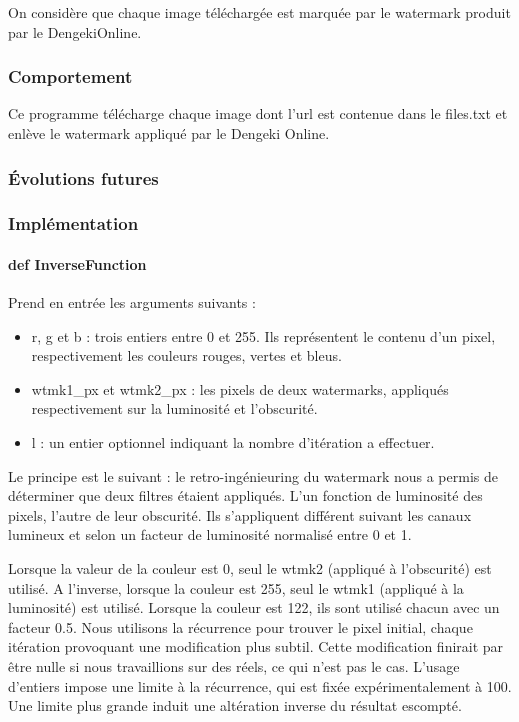 \documentclass[a4paper,12pt]{article}
\begin{document}
On considère que chaque image téléchargée est marquée par le watermark produit par le DengekiOnline.
\subsubsection{Comportement}
Ce programme télécharge chaque image dont l'url est contenue dans le files.txt et enlève le watermark appliqué par le Dengeki Online.
\subsubsection{Évolutions futures}
\subsubsection{Implémentation}
\paragraph{def InverseFunction}
Prend en entrée les arguments suivants :
\begin{itemize}
\item r, g et b : trois entiers entre 0 et 255. Ils représentent le contenu d'un pixel, respectivement les couleurs rouges, vertes et bleus.
\item wtmk1\_px et wtmk2\_px : les pixels de deux watermarks, appliqués respectivement sur la luminosité et l'obscurité.
\item l : un entier optionnel indiquant la nombre d'itération a effectuer.
\end{itemize}
Le principe est le suivant : le retro-ingénieuring du watermark nous a permis de déterminer que deux filtres étaient appliqués. L'un fonction de luminosité des pixels, l'autre de leur obscurité. Ils s'appliquent différent suivant les canaux lumineux et selon un facteur de luminosité normalisé entre 0 et 1.

Lorsque la valeur de la couleur est 0, seul le wtmk2 (appliqué à l'obscurité) est utilisé. A l'inverse, lorsque la couleur est 255, seul le wtmk1 (appliqué à la luminosité) est utilisé. Lorsque la couleur est 122, ils sont utilisé chacun avec un facteur 0.5. 
Nous utilisons la récurrence pour trouver le pixel initial, chaque itération provoquant une modification plus subtil. Cette modification finirait par être nulle si nous travaillions sur des réels, ce qui n'est pas le cas. L'usage d'entiers impose une limite à la récurrence, qui est fixée expérimentalement à 100. Une limite plus grande induit une altération inverse du résultat escompté. 
\end{document}
